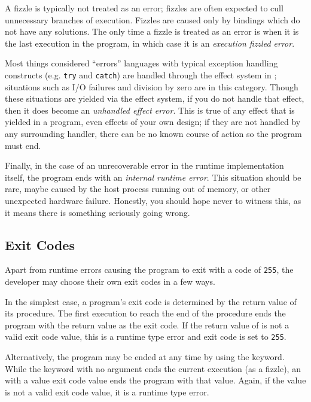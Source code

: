 A fizzle is typically not treated as an error; fizzles are often expected
to cull unnecessary branches of execution. Fizzles are caused only by bindings
which do not have any solutions. The only time a fizzle is treated as an error
is when it is the last execution in the program, in which case it is an \emph{execution
fizzled error}.

Most things considered ``errors'' languages with typical exception
handling constructs (e.g. \texttt{try} and \texttt{catch}) are handled through
the effect system in \Trilogy{}; situations such as I/O failures and division by
zero are in this category. Though these situations are yielded via the effect
system, if you do not handle that effect, then it does become an
\emph{unhandled effect error}. This is true of any effect that is yielded in
a program, even effects of your own design; if they are not handled by any
surrounding handler, there can be no known course of action so the program
must end.

Finally, in the case of an unrecoverable error in the runtime implementation
itself, the program ends with an \emph{internal runtime error}. This situation
should be rare, maybe caused by the host process running out of memory, or
other unexpected hardware failure. Honestly, you should hope never to witness
this, as it means there is something seriously going wrong.

\subsection{Exit Codes}
\label{sec:exitcode}

Apart from runtime errors causing the program to exit with a code of \texttt{255},
the developer may choose their own exit codes in a few ways.

In the simplest case, a \Trilogy{} program's exit code is determined by the
return value of its  procedure. The first execution to reach the end
of the  procedure ends the program with the return value as the exit
code. If the return value of  is not a valid exit code value, this
is a runtime type error and exit code is set to \texttt{255}.

Alternatively, the program may be ended at any time by using the  keyword.
While the  keyword with no argument ends the current execution (as a fizzle),
an  with a value exit code value ends the program with that value. Again, if
the value is not a valid exit code value, it is a runtime type error.

